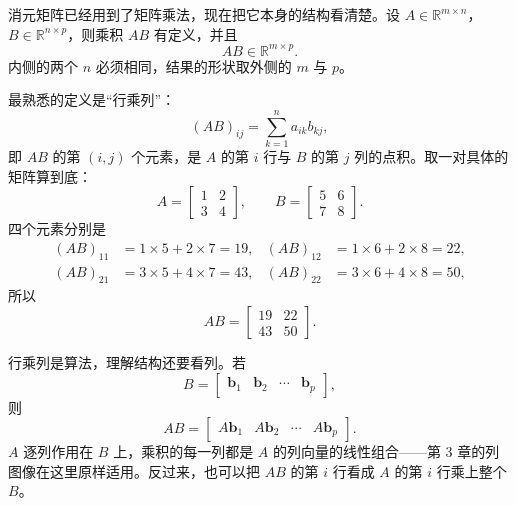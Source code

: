 \documentclass[UTF8,a4paper,12pt]{ctexart}
\numberwithin{equation}{section}
\newcommand{\R}{\mathbb{R}}
\begin{document}
	消元矩阵已经用到了矩阵乘法，现在把它本身的结构看清楚。设 $A\in\R^{m\times n}$，$B\in\R^{n\times p}$，则乘积 $AB$ 有定义，并且
	\begin{equation}\label{eq:4.20}
	AB\in\R^{m\times p}.
	\end{equation}
	内侧的两个 $n$ 必须相同，结果的形状取外侧的 $m$ 与 $p$。
	
	最熟悉的定义是“行乘列”：
	\begin{equation}\label{eq:4.21}
	(AB)_{ij}
	=
	\sum_{k=1}^{n}a_{ik}b_{kj},
	\end{equation}
	即 $AB$ 的第 $(i,j)$ 个元素，是 $A$ 的第 $i$ 行与 $B$ 的第 $j$ 列的点积。取一对具体的矩阵算到底：
	\begin{equation}\label{eq:4.22}
	A=
	\begin{bmatrix}
		1&2\\
		3&4
	\end{bmatrix},
	\qquad
	B=
	\begin{bmatrix}
		5&6\\
		7&8
	\end{bmatrix}.
	\end{equation}
	四个元素分别是
	\begin{equation}\label{eq:4.23}
	\begin{aligned}
		(AB)_{11}&=1\times5+2\times7=19, &
		(AB)_{12}&=1\times6+2\times8=22,\\
		(AB)_{21}&=3\times5+4\times7=43, &
		(AB)_{22}&=3\times6+4\times8=50,
	\end{aligned}
	\end{equation}
	所以
	\begin{equation}\label{eq:4.24}
	AB=
	\begin{bmatrix}
		19&22\\
		43&50
	\end{bmatrix}.
	\end{equation}
	
	行乘列是算法，理解结构还要看列。若
	\begin{equation}\label{eq:4.25}
	B=
	\begin{bmatrix}
		\bm{b}_1&\bm{b}_2&\cdots&\bm{b}_p
	\end{bmatrix},
	\end{equation}
	则
	\begin{equation}\label{eq:4.26}
	AB=
	\begin{bmatrix}
		A\bm{b}_1&A\bm{b}_2&\cdots&A\bm{b}_p
	\end{bmatrix}.
	\end{equation}
	$A$ 逐列作用在 $B$ 上，乘积的每一列都是 $A$ 的列向量的线性组合——第 3 章的列图像在这里原样适用。反过来，也可以把 $AB$ 的第 $i$ 行看成 $A$ 的第 $i$ 行乘上整个 $B$。
	
\end{document}
